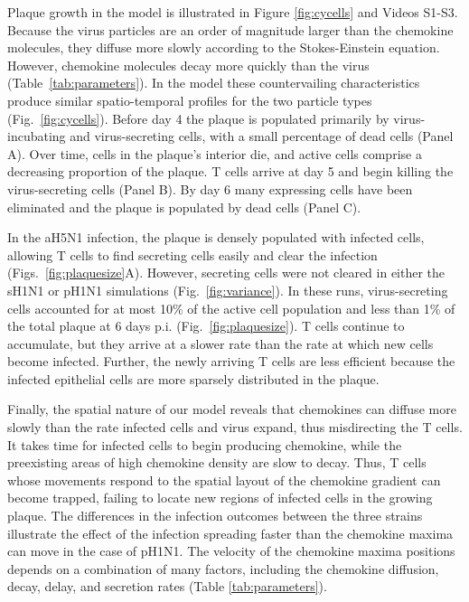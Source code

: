 \documentclass[preprint,10pt,numbers]{elsarticle}
\begin{document}
Plaque growth in the model is illustrated in Figure \ref{fig:cycells} and Videos S1-S3.  Because the virus particles are an order of magnitude larger than the chemokine molecules, they diffuse more slowly according to the Stokes-Einstein equation.  However, chemokine molecules decay more quickly than the virus (Table~\ref{tab:parameters}).  In the model these countervailing characteristics produce similar spatio-temporal profiles for the two particle types (Fig.~\ref{fig:cycells}). Before day 4 the plaque is populated primarily by virus-incubating and virus-secreting cells, with a small percentage of dead cells (Panel A). Over time, cells in the plaque's interior die, and active cells comprise a decreasing proportion of the plaque. T cells arrive at day 5 and begin killing the virus-secreting cells (Panel B). By day 6 many expressing cells have been eliminated and the plaque is populated by dead cells (Panel C).  

In the aH5N1 infection, the plaque is densely populated with infected cells, allowing T cells to find secreting cells easily and clear the infection (Figs.~\ref{fig:plaquesize}A).  However, secreting cells were not cleared in either the sH1N1 or pH1N1 simulations (Fig.~\ref{fig:variance}).  In these runs, virus-secreting cells accounted for at most 10\% of the active cell population and less than 1\% of the total plaque at 6 days p.i. (Fig.~\ref{fig:plaquesize}).  T cells continue to accumulate, but they arrive at a slower rate than the rate at which new cells become infected.  Further, the newly arriving T cells are less efficient because the infected epithelial cells are more sparsely distributed in the plaque.

Finally, the spatial nature of our model reveals that chemokines can diffuse more slowly than the rate infected cells and virus expand, thus misdirecting the T cells.  It takes time for infected cells to begin producing chemokine, while the preexisting areas of high chemokine density are slow to decay.  Thus, T cells whose movements respond to the spatial layout of the chemokine gradient can become trapped, failing to locate new regions of infected cells in the growing plaque.  The differences in the infection outcomes between the three strains illustrate the effect of the infection spreading faster than the chemokine maxima can move in the case of pH1N1.  The velocity of the chemokine maxima positions depends on a combination of many factors, including the chemokine diffusion, decay, delay, and secretion rates (Table \ref{tab:parameters}).
\end{document}
